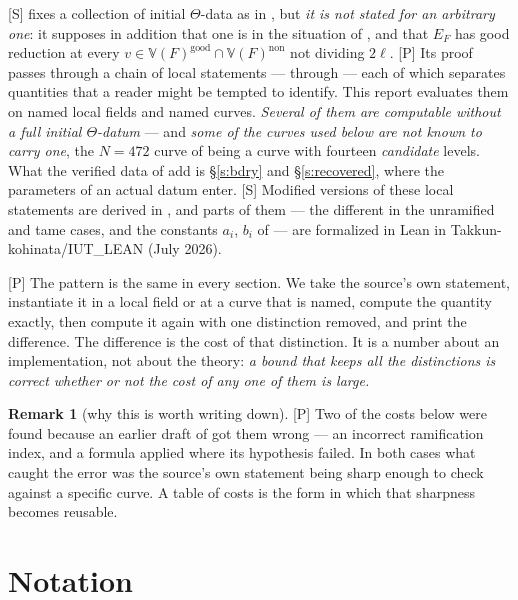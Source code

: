 \documentclass[11pt]{article}
\theoremstyle{plain}
\theoremstyle{definition}
\newtheorem{remark}{Remark}
\begin{document}
\textup{[S]} \cite[Thm.~1.10]{IUT4} fixes a collection of initial $\Theta$-data as in
\cite[Def.~3.1]{IUT1}, but \emph{it is not stated for an arbitrary one}: it supposes
in addition that one is in the situation of \cite[Cor.~3.12]{IUT3}, and that $E_F$ has
good reduction at every $v\in\mathbb V(F)^{\mathrm{good}}\cap\mathbb V(F)^{\mathrm{non}}$
not dividing $2\ell$.  \textup{[P]} Its proof passes through a chain of local statements --- \cite[Prop.~1.1]{IUT4}
through \cite[Prop.~1.7]{IUT4} --- each of which separates quantities that a reader
might be tempted to identify.  This report evaluates them on named local fields and
named curves.  \emph{Several of them are computable without a full initial
$\Theta$-datum} --- and \emph{some of the curves used below are not known to carry
one}, the $N=472$ curve of \cite[\S13]{Second} being a curve with fourteen
\emph{candidate} levels.  What the verified data of \cite{First,Second} add is
\S\ref{s:bdry} and \S\ref{s:recovered}, where the parameters of an actual datum enter.
\textup{[S]} Modified versions of these local statements are derived in
\cite[\S1.1]{Zhou}, and parts of them --- the different in the unramified and tame
cases, and the constants $a_i$, $b_i$ of \cite[Prop.~1.2]{IUT4} --- are formalized in
Lean in Takkun-kohinata/IUT\_LEAN \cite{TK} (July 2026).

\textup{[P]} The pattern is the same in every section.  We take the source's own
statement, instantiate it in a local field or at a curve that is named, compute the
quantity exactly, then compute it again with one distinction removed, and print the
difference.  The difference is the cost of that distinction.  It is a number about an
implementation, not about the theory: \emph{a bound that keeps all the distinctions is
correct whether or not the cost of any one of them is large.}

\begin{remark}[why this is worth writing down]\label{r:why}
\textup{[P]} Two of the costs below were found because an earlier draft of
\cite{Second} got them wrong --- an incorrect ramification index, and a formula applied
where its hypothesis failed.  In both cases what caught the error was the source's own
statement being sharp enough to check against a specific curve.  A table of costs is
the form in which that sharpness becomes reusable.
\end{remark}

\section{Notation}\label{s:not}
\end{document}
